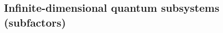 \documentclass[a4paper,11pt]{article}
\theoremstyle{definition}
\begin{document}

\subsection{Infinite-dimensional quantum subsystems (subfactors)}
\label{subsec:quantum-coarse}
\end{document}
